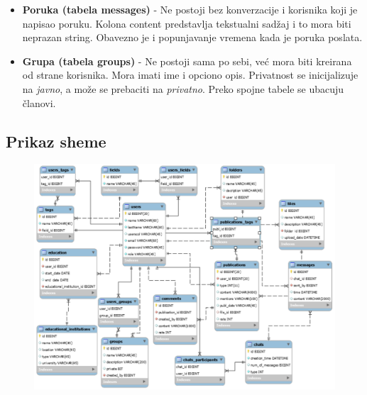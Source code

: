 \begin{itemize}
    \item \textbf{Poruka (tabela messages)} -
    Ne postoji bez konverzacije i korisnika koji je napisao poruku. Kolona content predstavlja tekstualni sadžaj i to mora biti neprazan string. Obavezno je i popunjavanje vremena kada je poruka poslata.
    
    \item \textbf{Grupa (tabela groups)} -
    Ne postoji sama po sebi, već mora biti kreirana od strane korisnika. Mora imati ime i opciono opis. Privatnost se inicijalizuje na \textit{javno}, a može se prebaciti na \textit{privatno}. Preko spojne tabele se ubacuju članovi.
    
\end{itemize}

\clearpage

\subsection{Prikaz sheme}
\begin{figure}[h]
		\centerline{\includegraphics[scale=0.8]{slike/shema.png}}
\end{figure}

\clearpage